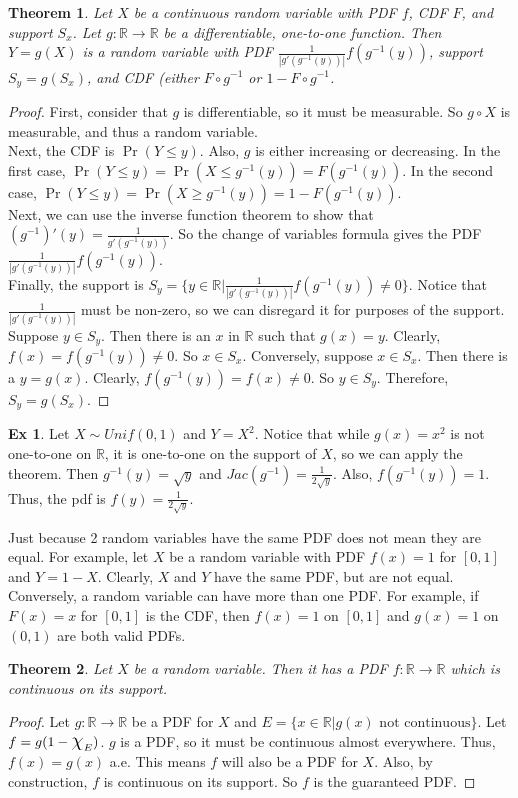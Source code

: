\documentclass{article}
\newtheorem{theorem}{Theorem}
\theoremstyle{definition}\newtheorem{definition}{DEF}
\theoremstyle{definition}\newtheorem{example}{Ex}
\theoremstyle{lemma}\newtheorem{lemma}{Lemma}
\theoremstyle{corrolary}\newtheorem{corrolary}{Cor}
\begin{document}
\begin{theorem}
Let $X$ be a continuous random variable with PDF $f$, CDF $F$, and support $S_x$.
Let $g: \mathbb{R} \rightarrow \mathbb{R}$ be a differentiable, one-to-one function.
Then $Y=g(X)$ is a random variable with PDF $\frac{1}{|g'(g^{-1}(y))|}f(g^{-1}(y))$, support $S_y = g(S_x)$, and CDF (either $F\circ g^{-1}$ or $1-F\circ g^{-1}$.
\end{theorem}
\begin{proof}
First, consider that $g$ is differentiable, so it must be measurable.
So $g\circ X$ is measurable, and thus a random variable. \\
Next, the CDF is $\Pr(Y\leq y)$.
Also, $g$ is either increasing or decreasing.
In the first case, $\Pr(Y\leq y)=\Pr(X\leq g^{-1}(y))=F(g^{-1}(y))$.
In the second case, $\Pr(Y\leq y)=\Pr(X\geq g^{-1}(y))=1-F(g^{-1}(y))$. \\
Next, we can use the inverse function theorem to show that $(g^{-1})' (y)=\frac{1}{g'(g^{-1}(y))}$.
So the change of variables formula gives the PDF $\frac{1}{|g'(g^{-1}(y))|}f(g^{-1}(y))$.\\
Finally, the support is $S_y=\{y\in \mathbb{R} | \frac{1}{|g'(g^{-1}(y))|}f(g^{-1}(y)) \neq 0 \}$.
Notice that $\frac{1}{|g'(g^{-1}(y))|}$ must be non-zero, so we can disregard it for purposes of the support.
Suppose $y\in S_y$.
Then there is an $x$ in $\mathbb{R}$ such that $g(x)=y$.
Clearly, $f(x)=f(g^{-1}(y))\neq 0$.
So $x \in S_x$.
Conversely, suppose $x \in S_x$.
Then there is a $y=g(x)$.
Clearly, $f(g^{-1}(y))=f(x)\neq0$.
So $y\in S_y$.
Therefore, $S_y=g(S_x)$.
\end{proof}

\begin{example}
Let $X\sim Unif(0,1)$ and $Y=X^2$.
Notice that while $g(x)=x^2$ is not one-to-one on $\mathbb{R}$, it is one-to-one on the support of $X$, so we can apply the theorem.
Then $g^{-1}(y)=\sqrt{y}$ and $Jac(g^{-1})=\frac{1}{2\sqrt{y}}$.
Also, $f(g^{-1}(y))=1$.
Thus, the pdf is $f(y)=\frac{1}{2\sqrt{y}}$.
\end{example}

Just because 2 random variables have the same PDF does not mean they are equal.
For example, let $X$ be a random variable with PDF $f(x)=1$ for $[0,1]$ and $Y=1-X$.
Clearly, $X$ and $Y$ have the same PDF, but are not equal.
Conversely, a random variable can have more than one PDF.
For example, if $F(x)=x$ for $[0,1]$ is the CDF, then $f(x)=1$ on $[0,1]$ and $g(x)=1$ on $(0,1)$ are both valid PDFs.

\begin{theorem}
Let $X$ be a random variable.
Then it has a PDF $f: \mathbb{R}\rightarrow \mathbb{R}$ which is continuous on its support.
\end{theorem}
\begin{proof}
Let $g:\mathbb{R} \rightarrow \mathbb{R}$ be a PDF for $X$ and $E=\{x\in \mathbb{R} | g(x)\text{ not continuous}\}$.
Let $f=g(1-\mbox{\Large$\chi$}_E)$.
$g$ is a PDF, so it must be continuous almost everywhere.
Thus, $f(x)=g(x)$ a.e.
This means $f$ will also be a PDF for $X$.
Also, by construction, $f$ is continuous on its support.
So $f$ is the guaranteed PDF.
\end{proof}
\end{document}
